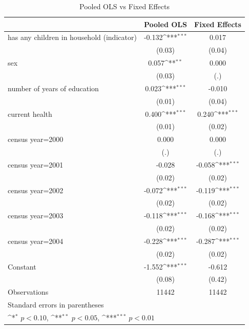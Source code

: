 \begin{table}[htbp]\centering
\def\sym#1{\ifmmode^{#1}\else\(^{#1}\)\fi}
\caption{Pooled OLS vs Fixed Effects}
\begin{tabular}{l*{2}{c}}
\hline\hline
                    &\multicolumn{1}{c}{Pooled OLS}&\multicolumn{1}{c}{Fixed Effects}\\
\hline
has any children in household (indicator)&      -0.132\sym{***}&       0.017         \\
                    &      (0.03)         &      (0.04)         \\
[1em]
sex                 &       0.057\sym{**} &       0.000         \\
                    &      (0.03)         &         (.)         \\
[1em]
number of years of education&       0.023\sym{***}&      -0.010         \\
                    &      (0.01)         &      (0.04)         \\
[1em]
current health      &       0.400\sym{***}&       0.240\sym{***}\\
                    &      (0.01)         &      (0.02)         \\
[1em]
census year=2000    &       0.000         &       0.000         \\
                    &         (.)         &         (.)         \\
[1em]
census year=2001    &      -0.028         &      -0.058\sym{***}\\
                    &      (0.02)         &      (0.02)         \\
[1em]
census year=2002    &      -0.072\sym{***}&      -0.119\sym{***}\\
                    &      (0.02)         &      (0.02)         \\
[1em]
census year=2003    &      -0.118\sym{***}&      -0.168\sym{***}\\
                    &      (0.02)         &      (0.02)         \\
[1em]
census year=2004    &      -0.228\sym{***}&      -0.287\sym{***}\\
                    &      (0.02)         &      (0.02)         \\
[1em]
Constant            &      -1.552\sym{***}&      -0.612         \\
                    &      (0.08)         &      (0.42)         \\
\hline
Observations        &       11442         &       11442         \\
\hline\hline
\multicolumn{3}{l}{\footnotesize Standard errors in parentheses}\\
\multicolumn{3}{l}{\footnotesize \sym{*} \(p<0.10\), \sym{**} \(p<0.05\), \sym{***} \(p<0.01\)}\\
\end{tabular}
\end{table}
